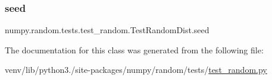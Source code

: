 \subsubsection{\texorpdfstring{seed}{seed}}
{\footnotesize\ttfamily numpy.\+random.\+tests.\+test\+\_\+random.\+Test\+Random\+Dist.\+seed}



The documentation for this class was generated from the following file\+:\begin{DoxyCompactItemize}
\item 
venv/lib/python3./site-\/packages/numpy/random/tests/\hyperlink{test__random_8py}{test\+\_\+random.\+py}\end{DoxyCompactItemize}
